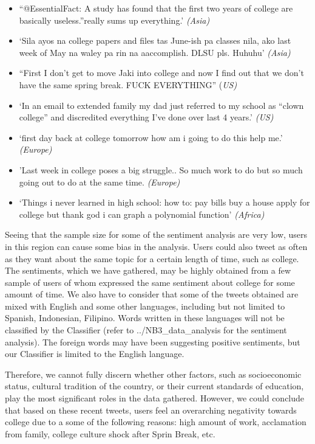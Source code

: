 \documentclass{article}
\begin{document}
\begin{itemize}
\itemsep1pt\parskip0pt
\item
  ``@EssentialFact: A study has found that the first two years of
  college are basically useless.''\n\nthat really sums up everything.'
  \emph{(Asia)}
\item
  `Sila ayos na college papers and files tas June-ish pa classes nila,
  ako last week of May na waley pa rin na aaccomplish. DLSU pls. Huhuhu'
  \emph{(Asia)}
\item
  ``First I don't get to move Jaki into college and now I find out that
  we don't have the same spring break. FUCK EVERYTHING'' (\emph{US)}
\item
  `In an email to extended family my dad just referred to my school as
  ``clown college'' and discredited everything I've done over last 4
  years.' \emph{(US)}
\item
  `first day back at college tomorrow how am i going to do this help
  me.' \emph{(Europe)}
\item
  'Last week in college poses a big struggle.. So much work to do but so
  much going out to do at the same time. \emph{(Europe)}
\item
  `Things i never learned in high school: how to: pay bills buy a house
  apply for college but thank god i can graph a polynomial function'
  \emph{(Africa)}
\end{itemize}

Seeing that the sample size for some of the sentiment analysis are very
low, users in this region can cause some bias in the analysis. Users
could also tweet as often as they want about the same topic for a
certain length of time, such as college. The sentiments, which we have
gathered, may be highly obtained from a few sample of users of whom
expressed the same sentiment about college for some amount of time. We
also have to consider that some of the tweets obtained are mixed with
English and some other languages, including but not limited to Spanish,
Indonesian, Filipino. Words written in these languages will not be
classified by the Classifier (refer to ../NB3\_data\_analysis for the
sentiment analysis). The foreign words may have been suggesting positive
sentiments, but our Classifier is limited to the English language.

Therefore, we cannot fully discern whether other factors, such as
socioeconomic status, cultural tradition of the country, or their
current standards of education, play the most significant roles in the
data gathered. However, we could conclude that based on these recent
tweets, users feel an overarching negativity towards college due to a
some of the following reasons: high amount of work, acclamation from
family, college culture shock after Sprin Break, etc.


    
    
    
    
\end{document}
